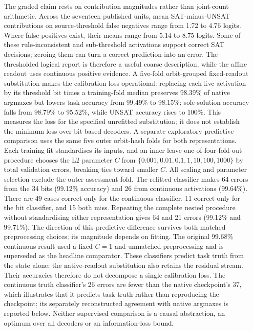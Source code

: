\documentclass[
  british,
  11pt,
  a4paper,
]{article}
\begin{document}
The graded claim rests on contribution magnitudes rather than
joint-count arithmetic. Across the seventeen published units, mean
SAT-minus-UNSAT contributions on source-threshold false negatives range
from 1.72 to 4.76 logits. Where false positives exist, their means range
from 5.14 to 8.75 logits. Some of these rule-inconsistent and
sub-threshold activations support correct SAT decisions; zeroing them
can turn a correct prediction into an error. The thresholded logical
report is therefore a useful coarse description, while the affine
readout uses continuous positive evidence. A five-fold orbit-grouped
fixed-readout substitution makes the calibration loss operational:
replacing each live activation by its threshold bit times a
training-fold median preserves 98.39\% of native argmaxes but lowers
task accuracy from 99.49\% to 98.15\%; sole-solution accuracy falls from
98.79\% to 95.52\%, while UNSAT accuracy rises to 100\%. This measures
the loss for the specified unrefitted substitution; it does not
establish the minimum loss over bit-based decoders. A separate
exploratory predictive comparison uses the same five outer orbit-hash
folds for both representations. Each training fit standardises its
inputs, and an inner leave-one-of-four-fold-out procedure chooses the L2
parameter \(C\) from \(\{0.001,0.01,0.1,1,10,100,1000\}\) by total
validation errors, breaking ties toward smaller \(C\). All scaling and
parameter selection exclude the outer assessment fold. The refitted
classifier makes 64 errors from the 34 bits (99.12\% accuracy) and 26
from continuous activations (99.64\%). There are 49 cases correct only
for the continuous classifier, 11 correct only for the bit classifier,
and 15 both miss. Repeating the complete nested procedure without
standardising either representation gives 64 and 21 errors (99.12\% and
99.71\%). The direction of this predictive difference survives both
matched preprocessing choices; its magnitude depends on fitting. The
original 99.68\% continuous result used a fixed \(C=1\) and unmatched
preprocessing and is superseded as the headline comparator. These
classifiers predict task truth from the state alone; the native-readout
substitution also retains the residual stream. Their accuracies
therefore do not decompose a single calibration loss. The continuous
truth classifier's 26 errors are fewer than the native checkpoint's 37,
which illustrates that it predicts task truth rather than reproducing
the checkpoint; its separately reconstructed agreement with native
argmaxes is reported below. Neither supervised comparison is a causal
abstraction, an optimum over all decoders or an information-loss bound.
\end{document}
